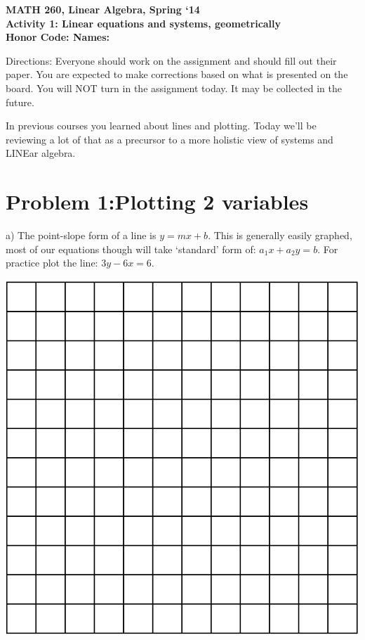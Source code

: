 \documentclass{article}
\begin{document}
\begin{flushleft}
	\bfseries{MATH 260, Linear Algebra, Spring `14}\\
	\bfseries{Activity 1:  Linear equations and systems, geometrically}\\
	\bfseries{Honor Code:} \hspace{3.5in}\bfseries{Names:}\\
\end{flushleft}
\begin{flushleft}
\vspace{.25in}

Directions:  Everyone should work on the assignment and should fill out their paper.  You are expected to make corrections based on what is presented on the board.  You will NOT turn in the assignment today.  It may be collected in the future.

\vspace{0.2in}

In previous courses you learned about lines and plotting. Today we'll be reviewing a lot of that as a precursor to a more holistic view of systems and LINEar algebra.

\section*{Problem 1:Plotting 2 variables}
\vspace{0.1in}

a) The point-slope form of a line is $y=mx+b$. This is generally easily graphed, most of our equations though will take `standard' form of: $a_1 x + a_2 y = b$. For practice plot the line: $3y-6x=6$.
\vspace{0.1in}
\begin{minipage}{3in}
\includegraphics[scale=0.75]{grid_12_by_12.eps}
\end{minipage}
\vspace{0.2in}


\end{flushleft}
\end{document}

